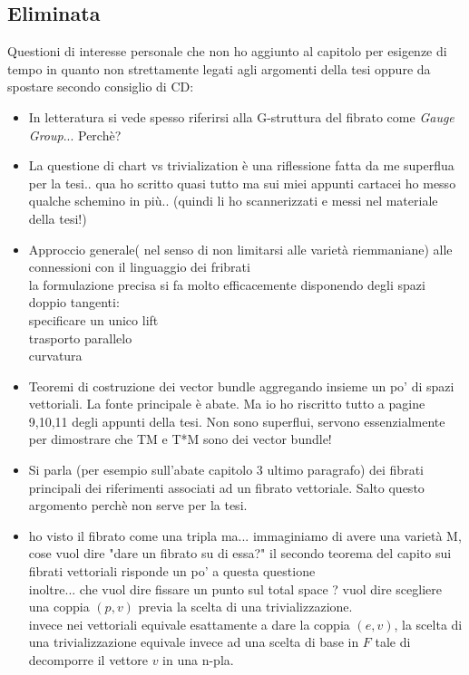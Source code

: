 \documentclass[a4paper,12pt]{scrartcl}    %
\begin{document}
\subsection{Eliminata}
Questioni di interesse personale che non ho aggiunto al capitolo per esigenze di tempo  in quanto non strettamente legati agli argomenti della tesi oppure da spostare secondo consiglio di CD:
\begin{itemize}


\item In letteratura si vede spesso riferirsi alla G-struttura del fibrato come \emph{Gauge Group}... Perchè?

\item La questione di chart vs trivialization è una riflessione fatta da me superflua per la tesi.. qua ho scritto quasi tutto ma sui miei appunti cartacei ho messo qualche schemino in più.. (quindi li ho scannerizzati e messi nel materiale della tesi!)

\item Approccio generale( nel senso di non limitarsi alle varietà riemmaniane) alle connessioni con il linguaggio dei fribrati\\ la formulazione precisa si fa molto efficacemente disponendo degli spazi doppio tangenti:
\\	specificare un unico lift
\\	trasporto parallelo
\\	curvatura

\item Teoremi di costruzione dei vector bundle aggregando insieme un po' di spazi vettoriali. La fonte principale è abate. Ma io ho riscritto tutto a pagine 9,10,11 degli appunti della tesi.
Non sono superflui, servono essenzialmente per dimostrare che TM e T*M sono dei vector bundle!

\item Si parla (per esempio sull'abate capitolo 3 ultimo paragrafo) dei fibrati principali dei riferimenti associati ad un fibrato vettoriale. Salto questo argomento perchè non serve per la tesi.

\item ho visto il fibrato come una tripla ma... immaginiamo di avere una varietà M, cose vuol dire "dare un fibrato su di essa?" il secondo teorema del capito sui fibrati vettoriali risponde un po' a questa questione
\\ inoltre... che vuol dire fissare un punto sul total space ? vuol dire scegliere una coppia $(p,v)$ previa la scelta di una trivializzazione.
\\ invece nei vettoriali equivale esattamente a dare la coppia $(e,v)$, la scelta  di una trivializzazione equivale invece ad una scelta di base in $F$ tale di decomporre il vettore $v$ in una n-pla.


\end{itemize}
\end{document}
